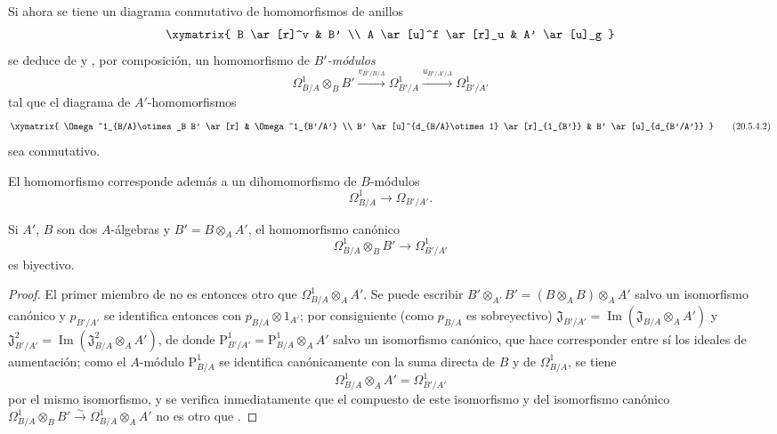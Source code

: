 \begin{env}[20.5.4]
\label{0.20.5.4-fr}
Si ahora se tiene un diagrama conmutativo de homomorfismos de anillos
\[
\xymatrix{
  B \ar[r]^v & B' \\
  A \ar[u]^f \ar[r]_u & A' \ar[u]_g
}
\]
se deduce de  y , por composición,
un homomorfismo de \emph{$B'$-módulos}
\begin{equation}
\tag{20.5.4.1}
\label{0.20.5.4.1-fr}
  \Omega^1_{B/A}\otimes_B B'
  \xrightarrow{v_{B'/B/A}}\Omega^1_{B'/A}
  \xrightarrow{u_{B'/A'/A}}\Omega^1_{B'/A'}
\end{equation}
tal que el diagrama de $A'$-homomorfismos
\[
\xymatrix{
  \Omega^1_{B/A}\otimes_B B' \ar[r] & \Omega^1_{B'/A'} \\
  B' \ar[u]^{d_{B/A}\otimes1} \ar[r]_{1_{B'}} &
  B' \ar[u]_{d_{B'/A'}}
}
\tag{20.5.4.2}
\label{0.20.5.4.2-fr}
\]
sea conmutativo.

El homomorfismo  corresponde además a un
dihomomorfismo de $B$-módulos
\begin{equation}
\tag{20.5.4.3}
\label{0.20.5.4.3-fr}
  \Omega^1_{B/A}\to\Omega_{B'/A'}.
\end{equation}
\end{env}

\begin{proposition}[20.5.5]
\label{0.20.5.5-fr}
Si $A'$, $B$ son dos $A$-álgebras y $B'=B\otimes_A A'$,
el homomorfismo canónico \textup{}
\begin{equation}
\tag{20.5.5.1}
\label{0.20.5.5.1-fr}
  \Omega^1_{B/A}\otimes_B B'\to\Omega^1_{B'/A'}
\end{equation}
es biyectivo.
\end{proposition}

\begin{proof}
El primer miembro de  no es entonces otro que
$\Omega^1_{B/A}\otimes_A A'$. Se puede escribir
$B'\otimes_{A'}B'=(B\otimes_A B)\otimes_A A'$ salvo un isomorfismo canónico
y $p_{B'/A'}$ se identifica entonces con
$p_{B/A}\otimes1_{A'}$; por consiguiente (como $p_{B/A}$ es sobreyectivo)
$\mathfrak{J}_{B'/A'}=\operatorname{Im}(\mathfrak{J}_{B/A}\otimes_A A')$
y
$\mathfrak{J}^2_{B'/A'}
=\operatorname{Im}(\mathfrak{J}^2_{B/A}\otimes_A A')$, de donde
$\mathrm{P}^1_{B'/A'}=\mathrm{P}^1_{B/A}\otimes_A A'$ salvo un isomorfismo
canónico, que hace corresponder entre sí los ideales de aumentación;
como el $A$-módulo $\mathrm{P}^1_{B/A}$ se identifica canónicamente con la
suma directa de $B$ y de $\Omega^1_{B/A}$, se tiene
\begin{equation}
\tag{20.5.5.2}
\label{0.20.5.5.2-fr}
  \Omega^1_{B/A}\otimes_A A'=\Omega^1_{B'/A'}
\end{equation}
por el mismo isomorfismo, y se verifica inmediatamente que el compuesto de este
isomorfismo y del isomorfismo canónico
$\Omega^1_{B/A}\otimes_B B'\xrightarrow{\sim}
\Omega^1_{B/A}\otimes_A A'$ no es otro que .
\end{proof}

